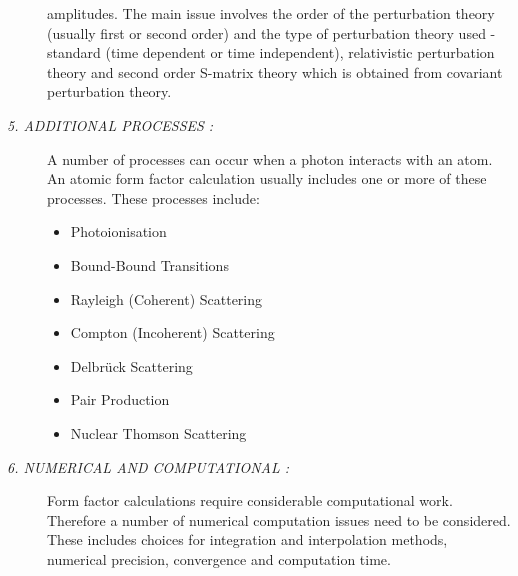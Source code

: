 \begin{description}
    amplitudes. The main issue involves the order of the perturbation theory 
    (usually first or second order) and the type of perturbation theory used -
    standard (time dependent or time independent), relativistic perturbation
    theory and second order S-matrix theory which is obtained from covariant
    perturbation theory.
    \item[\it 5. ADDITIONAL PROCESSES :]
    A number of processes can occur when a photon interacts with an atom. 
    An atomic form factor calculation usually includes one or more of these
    processes. These processes include:
        \begin{itemize}
            \item Photoionisation
            \item Bound-Bound Transitions
            \item Rayleigh (Coherent) Scattering
            \item Compton (Incoherent) Scattering
            \item Delbr\"uck Scattering
            \item Pair Production
            \item Nuclear Thomson Scattering
        \end{itemize}
    \item[\it 6. NUMERICAL AND COMPUTATIONAL :]
    Form factor calculations require considerable computational work. Therefore
    a number of numerical computation issues need to be considered. These
    includes choices for integration and interpolation methods, numerical
    precision, convergence and computation time.
\end{description}







